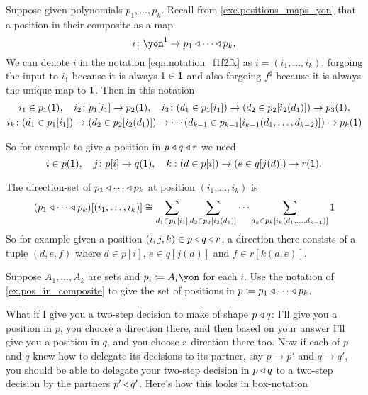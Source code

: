 \documentclass[Book-Poly]{subfiles}
\begin{document}
\begin{example}\label{ex.pos_in_composite}
Suppose given polynomials $p_1,\ldots,p_k$. Recall from \cref{exc.positions_maps_yon} that a position in their composite as a map
\[
i\colon \yon^\1\to p_1\tri\cdots\tri p_k.
\]
We can denote $i$ in the notation \eqref{eqn.notation_f1f2fk} as $i=(i_1,\ldots,i_k)$, forgoing the input to $i_1$ because it is always $1\in\textsf{1}$ and also forgoing $f^\sharp$ because it is always the unique map to $\textsf{1}$. Then in this notation 
\begin{gather*}
i_1\in p_1(\textsf{1}),\quad
i_2\colon p_1[i_1]\to p_2(\textsf{1}),\quad
i_3\colon (d_1\in p_1[i_1])\to(d_2\in p_2[i_2(d_1)])\to p_3(\textsf{1}),\\
i_k\colon(d_1\in p_1[i_1])\to(d_2\in p_2[i_2(d_1)])\to\cdots(d_{k-1}\in p_{k-1}[i_{k-1}(d_1,\ldots,d_{k-2})])\to p_k(\textsf{1})
\end{gather*}

So for example to give a position in $p\mathbin{\triangleleft} q\mathbin{\triangleleft} r$ we need 
\[
i\in p(\textsf{1}),\quad
j\colon p[i]\to q(\textsf{1}),\quad
k:(d\in p[i])\to(e\in q[j(d)])\to r(\textsf{1}).
\]

The direction-set of $p_1\mathbin{\triangleleft}\cdots\mathbin{\triangleleft} p_k$ at position $(i_1,\ldots,i_k)$ is 
\[
(p_1\mathbin{\triangleleft}\cdots\mathbin{\triangleleft} p_k)[(i_1,\ldots,i_k)]\cong\sum_{d_1\in p_1[i_1]}\sum_{d_2\in p_2[i_2(d_1)]}\cdots\sum_{d_k\in p_k[i_k(d_1,\ldots,d_{k-1})]}\textsf{1}
\]
So for example given a position $(i,j,k)\in p\mathbin{\triangleleft} q\mathbin{\triangleleft} r$, a direction there consists of a tuple $(d,e,f)$ where $d\in p[i]$, $e\in q[j(d)]$ and $f\in r[k(d,e)]$.
\end{example}

\begin{exercise}
Suppose $A_1,\ldots,A_k$ are sets and $p_i\coloneqq A_i\yon$ for each $i$. Use the notation of \cref{ex.pos_in_composite} to give the set of positions in $p\coloneqq p_1\mathbin{\triangleleft}\cdots\mathbin{\triangleleft} p_k$.
\end{exercise}

What if I give you a two-step decision to make of shape $p\mathbin{\triangleleft} q$: I'll give you a position in $p$, you choose a direction there, and then based on your answer I'll give you a position in $q$, and you choose a direction there too. Now if each of $p$ and $q$ knew how to delegate its decisions to its partner, say $p\to p'$ and $q\to q'$, you should be able to delegate your two-step decision in $p\mathbin{\triangleleft} q$ to a two-step decision by the partners $p'\mathbin{\triangleleft} q'$. Here's how this looks in box-notation
\end{document}
